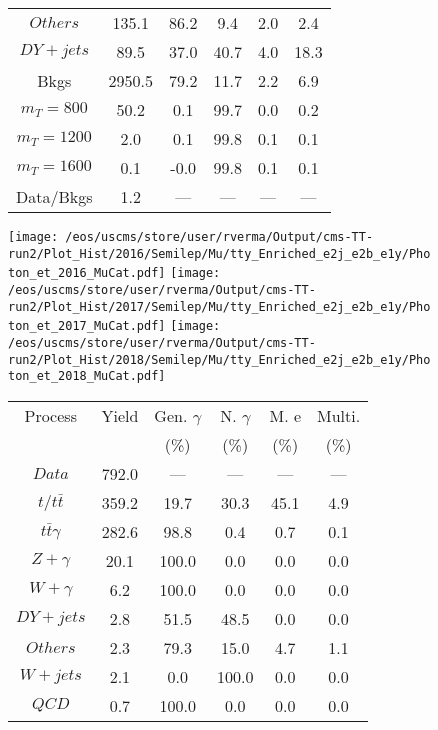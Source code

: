 \begin{figure}
\begin{minipage}[c]{0.32\textwidth}
{\begin{tabular}{cccccc}
$ Others $ &  135.1 &  86.2 &  9.4 &  2.0 &  2.4\\
$ DY+jets $ &  89.5 &  37.0 &  40.7 &  4.0 &  18.3\\
Bkgs &  2950.5 &  79.2 &  11.7 &  2.2 &  6.9\\
$ m_{T} = 800 $ &  50.2 &  0.1 &  99.7 &  0.0 &  0.2\\
$ m_{T} = 1200 $ &  2.0 &  0.1 &  99.8 &  0.1 &  0.1\\
$ m_{T} = 1600 $ &  0.1 &  -0.0 &  99.8 &  0.1 &  0.1\\
Data/Bkgs &  1.2 &  --- &  --- &  --- &  ---\\
\hline
\end{tabular}
}
\end{minipage}
\end{figure}

\begin{figure}
\centering
\texttt{[image: /eos/uscms/store/user/rverma/Output/cms-TT-run2/Plot\_Hist/2016/Semilep/Mu/tty\_Enriched\_e2j\_e2b\_e1y/Photon\_et\_2016\_MuCat.pdf]}
\texttt{[image: /eos/uscms/store/user/rverma/Output/cms-TT-run2/Plot\_Hist/2017/Semilep/Mu/tty\_Enriched\_e2j\_e2b\_e1y/Photon\_et\_2017\_MuCat.pdf]}
\texttt{[image: /eos/uscms/store/user/rverma/Output/cms-TT-run2/Plot\_Hist/2018/Semilep/Mu/tty\_Enriched\_e2j\_e2b\_e1y/Photon\_et\_2018\_MuCat.pdf]}
\begin{minipage}[c]{0.32\textwidth}
\centering
\tiny{
\begin{tabular}{cccccc}
\hline
Process & Yield & Gen. $\gamma$ & N. $\gamma$ & M. e & Multi. \\
 &  & (\%) & (\%) & (\%) & (\%)  \\
\hline
                                                                      $ Data $ &  792.0 &  --- &  --- &  --- &  ---\\
$ t/t\bar{t} $ &  359.2 &  19.7 &  30.3 &  45.1 &  4.9\\
$ t\bar{t}\gamma $ &  282.6 &  98.8 &  0.4 &  0.7 &  0.1\\
$ Z+\gamma $ &  20.1 &  100.0 &  0.0 &  0.0 &  0.0\\
$ W+\gamma $ &  6.2 &  100.0 &  0.0 &  0.0 &  0.0\\
$ DY+jets $ &  2.8 &  51.5 &  48.5 &  0.0 &  0.0\\
$ Others $ &  2.3 &  79.3 &  15.0 &  4.7 &  1.1\\
$ W+jets $ &  2.1 &  0.0 &  100.0 &  0.0 &  0.0\\
$ QCD $ &  0.7 &  100.0 &  0.0 &  0.0 &  0.0\\

\end{tabular}}
\end{minipage}
\end{figure}
